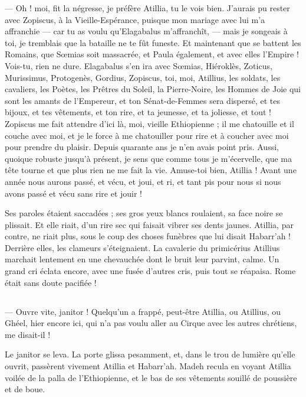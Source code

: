 \documentclass[a4paper, 11pt, oneside, polutonikogreek, french]{article}
\begin{document}
--- Oh ! moi, fit la négresse, je préfère Atillia, tu le vois bien. J'aurais pu rester avec Zopiscus, à la Vieille-Espérance, puisque mon mariage avec lui m'a affranchie --- car tu as voulu qu'Elagabalus m'affranchît, --- mais je songeais à toi, je tremblais que la bataille ne te fût funeste. Et maintenant que se battent les Romains, que Sœmias soit massacrée, et Paula également, et avec elles l'Empire ! Vois-tu, rien ne dure. Elagabalus s'en ira avec Sœmias, Hiéroklès, Zoticus, Murissimus, Protogenès, Gordius, Zopiscus, toi, moi, Atillius, les soldats, les cavaliers, les Poètes, les Prêtres du Soleil, la Pierre-Noire, les Hommes de Joie qui sont les amants de l'Empereur, et ton Sénat-de-Femmes sera dispersé, et tes bijoux, et tes vêtements, et ton rire, et ta jeunesse, et ta joliesse, et tout ! Zopiscus me fait attendre d'ici là, moi, vieille Ethiopienne ; il me chatouille et il couche avec moi, et je le force à me chatouiller pour rire et à coucher avec moi pour prendre du plaisir. Depuis quarante ans je n'en avais point pris. Aussi, quoique robuste jusqu'à présent, je sens que comme tous je m'écervelle, que ma tête tourne et que plus rien ne me fait la vie. Amuse-toi bien, Atillia ! Avant une année nous aurons passé, et vécu, et joui, et ri, et tant pis pour nous si nous avons passé et vécu sans rire et jouir !

Ses paroles étaient saccadées ; ses gros yeux blancs roulaient, sa face noire se plissait. Et elle riait, d'un rire sec qui faisait vibrer ses dents jaunes. Atillia, par contre, ne riait plus, sous le coup des choses funèbres que lui disait Habarr'ah ! Derrière elles, les clameurs s'éteignaient. La cavalerie du primicérius Atillius marchait lentement en une chevauchée dont le bruit leur parvint, calme. Un grand cri éclata encore, avec une fusée d'autres cris, puis tout se réapaisa. Rome était sans doute pacifiée !
\clearpage
\subsection{}
\paragraph{}
--- Ouvre vite, janitor ! Quelqu'un a frappé, peut-être Atillia, ou Atillius, ou Ghéel, hier encore ici, qui n'a pas voulu aller au Cirque avec les autres chrétiens, me disait-il !

Le janitor se leva. La porte glissa pesamment, et, dans le trou de lumière qu'elle ouvrit, passèrent vivement Atillia et Habarr'ah. Madeh recula en voyant Atillia voilée de la palla de l'Ethiopienne, et le bas de ses vêtements souillé de poussière et de boue.
\end{document}
